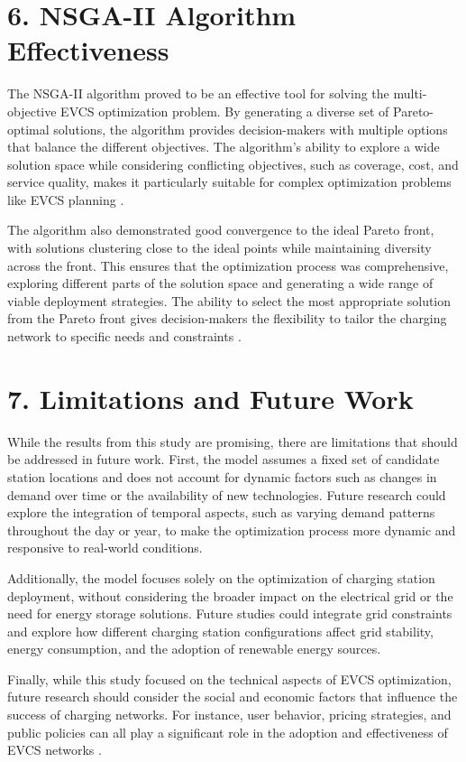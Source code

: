 \section{6. NSGA-II Algorithm Effectiveness}

The NSGA-II algorithm proved to be an effective tool for solving the multi-objective EVCS optimization problem. By generating a diverse set of Pareto-optimal solutions, the algorithm provides decision-makers with multiple options that balance the different objectives. The algorithm’s ability to explore a wide solution space while considering conflicting objectives, such as coverage, cost, and service quality, makes it particularly suitable for complex optimization problems like EVCS planning \citep{A multi-objective optimization model for electric vehicle charging station location planning}.

The algorithm also demonstrated good convergence to the ideal Pareto front, with solutions clustering close to the ideal points while maintaining diversity across the front. This ensures that the optimization process was comprehensive, exploring different parts of the solution space and generating a wide range of viable deployment strategies. The ability to select the most appropriate solution from the Pareto front gives decision-makers the flexibility to tailor the charging network to specific needs and constraints \citep{A multi-objective optimization model for electric vehicle charging station location planning}.

\section{7. Limitations and Future Work}

While the results from this study are promising, there are limitations that should be addressed in future work. First, the model assumes a fixed set of candidate station locations and does not account for dynamic factors such as changes in demand over time or the availability of new technologies. Future research could explore the integration of temporal aspects, such as varying demand patterns throughout the day or year, to make the optimization process more dynamic and responsive to real-world conditions.

Additionally, the model focuses solely on the optimization of charging station deployment, without considering the broader impact on the electrical grid or the need for energy storage solutions. Future studies could integrate grid constraints and explore how different charging station configurations affect grid stability, energy consumption, and the adoption of renewable energy sources.

Finally, while this study focused on the technical aspects of EVCS optimization, future research should consider the social and economic factors that influence the success of charging networks. For instance, user behavior, pricing strategies, and public policies can all play a significant role in the adoption and effectiveness of EVCS networks \citep{A genetic algorithm-based optimization for the location of electric vehicle charging stations}.
